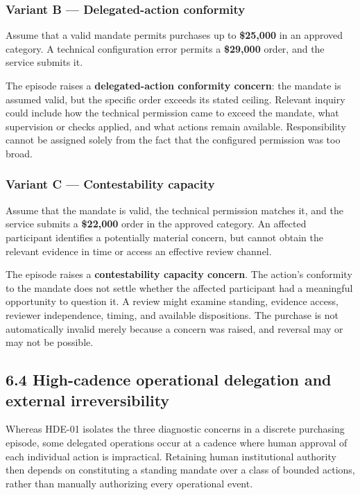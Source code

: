 \documentclass[
  10pt,
]{article}
\begin{document}
\subsubsection{Variant B --- Delegated-action
conformity}\label{variant-b-delegated-action-conformity}

Assume that a valid mandate permits purchases up to \textbf{\$25,000} in
an approved category. A technical configuration error permits a
\textbf{\$29,000} order, and the service submits it.

The episode raises a \textbf{delegated-action conformity concern}: the
mandate is assumed valid, but the specific order exceeds its stated
ceiling. Relevant inquiry could include how the technical permission
came to exceed the mandate, what supervision or checks applied, and what
actions remain available. Responsibility cannot be assigned solely from
the fact that the configured permission was too broad.

\subsubsection{Variant C --- Contestability
capacity}\label{variant-c-contestability-capacity}

Assume that the mandate is valid, the technical permission matches it,
and the service submits a \textbf{\$22,000} order in the approved
category. An affected participant identifies a potentially material
concern, but cannot obtain the relevant evidence in time or access an
effective review channel.

The episode raises a \textbf{contestability capacity concern}. The
action's conformity to the mandate does not settle whether the affected
participant had a meaningful opportunity to question it. A review might
examine standing, evidence access, reviewer independence, timing, and
available dispositions. The purchase is not automatically invalid merely
because a concern was raised, and reversal may or may not be possible.

\subsection{6.4 High-cadence operational delegation and external
irreversibility}\label{high-cadence-operational-delegation-and-external-irreversibility}

Whereas HDE-01 isolates the three diagnostic concerns in a discrete
purchasing episode, some delegated operations occur at a cadence where
human approval of each individual action is impractical. Retaining human
institutional authority then depends on constituting a standing mandate
over a class of bounded actions, rather than manually authorizing every
operational event.
\end{document}
